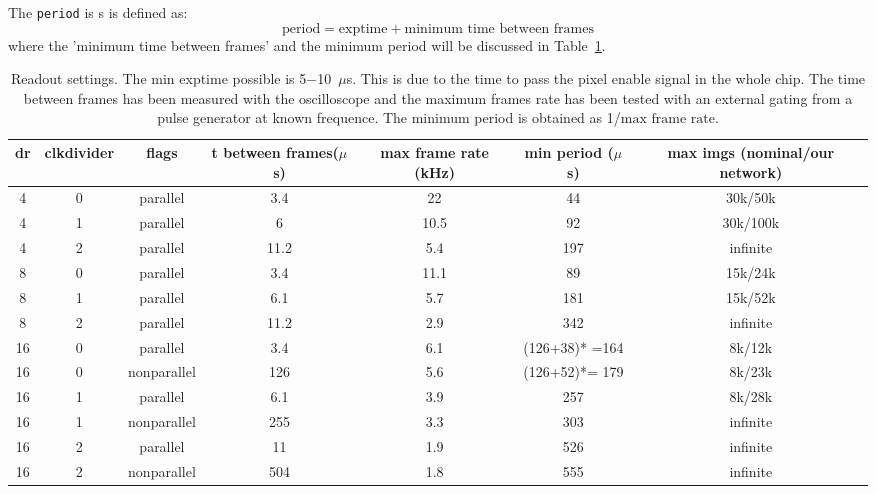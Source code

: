 \documentclass{article}
\begin{document}
The {\tt{period}} is s is defined as:
\begin{equation} \label{period}
\textrm{period}  = \textrm{exptime} + \textrm{minimum time between frames}
\end{equation}
where the 'minimum time between frames' and the minimum period will be discussed in Table~\ref{tframes}.
\begin{tiny}
\begin{table}
\begin{flushleft}
\begin{tabular}{|c|c|c|c|c|c|c|}
\hline
\tiny{dr} & \tiny{clkdivider} & \tiny{flags} & \tiny{t between frames($\mu$s) } &  \tiny{max frame rate (kHz)} & \tiny{min period ($\mu$s)} & \tiny{max imgs (nominal/our network)}\\
\hline
4 & 0 & parallel & 3.4 & 22  & 44 & 30k/50k\\
\hline
4 & 1 & parallel & 6 & 10.5 & 92 & 30k/100k\\
\hline
4 & 2 & parallel & 11.2 & 5.4 & 197 & infinite\\
\hline
\hline
8 & 0 & parallel & 3.4 & 11.1 & 89 & 15k/24k\\
\hline
8 & 1 & parallel & 6.1 & 5.7 & 181 & 15k/52k\\
\hline
8 & 2 & parallel & 11.2 &  2.9 &  342 & infinite\\
\hline
\hline
16 & 0 & parallel & 3.4 & 6.1 & (126+38)* =164 & 8k/12k\\
\hline
16 & 0 & nonparallel &  126 & 5.6 & (126+52)*= 179 & 8k/23k\\
\hline
16 & 1 & parallel &  6.1 & 3.9 &  257 & 8k/28k\\
\hline
16 & 1 & nonparallel & 255 & 3.3 &  303 & infinite\\
\hline
16 & 2 & parallel &  11 & 1.9 & 526 & infinite \\
\hline
16 & 2 & nonparallel & 504 & 1.8  & 555 & infinite\\
\hline
\end{tabular}
\caption{Readout settings. The {\tiny{min exptime}} possible is 5$-$10~$\mu$s. This is due to the time to pass the pixel enable signal in the whole chip. The time between frames has been measured with the oscilloscope and the maximum frames rate has been tested with an external gating from a pulse generator at known frequence. The minimum period is obtained as 1/$\textrm{max frame rate}$.}
\label{tframes}
\end{flushleft}
\end{table}
\end{tiny}
\end{document}
